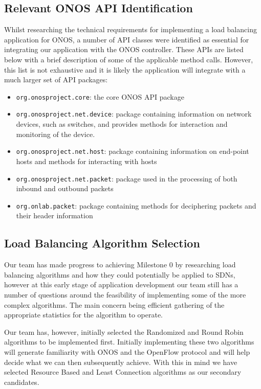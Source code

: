\subsection{Relevant ONOS API Identification}
Whilst researching the technical requirements for implementing a load balancing application for ONOS, a number of API classes were identified as essential for integrating our application with the ONOS controller. These APIs are listed below with a brief description of some of the applicable method calls. However, this list is not exhaustive and it is likely the application will integrate with a much larger set of API packages:
\begin{itemize}
    \item \lstinline{org.onosproject.core}: the core ONOS API package 
    \item \lstinline{org.onosproject.net.device}: package containing information on network devices, such as switches, and provides methods for interaction and monitoring of the device.
    \item \lstinline{org.onosproject.net.host}: package containing information on end-point hosts and methods for interacting with hosts
    \item \lstinline{org.onosproject.net.packet}: package used in the processing of both inbound and outbound packets
    \item \lstinline{org.onlab.packet}: package containing methods for deciphering packets and their header information
\end{itemize}

\subsection{Load Balancing Algorithm Selection}
Our team has made progress to achieving Milestone 0 by researching load balancing algorithms and how they could potentially be applied to SDNs, however at this early stage of application development our team still has a number of questions around the feasibility of implementing some of the more complex algorithms. The main concern being efficient gathering of the appropriate statistics for the algorithm to operate.

Our team has, however, initially selected the Randomized and Round Robin algorithms to be implemented first. Initially implementing these two algorithms will generate familiarity with ONOS and the OpenFlow protocol and will help decide what we can then subsequently achieve. With this in mind we have selected Resource Based and Least Connection algorithms as our secondary candidates.

